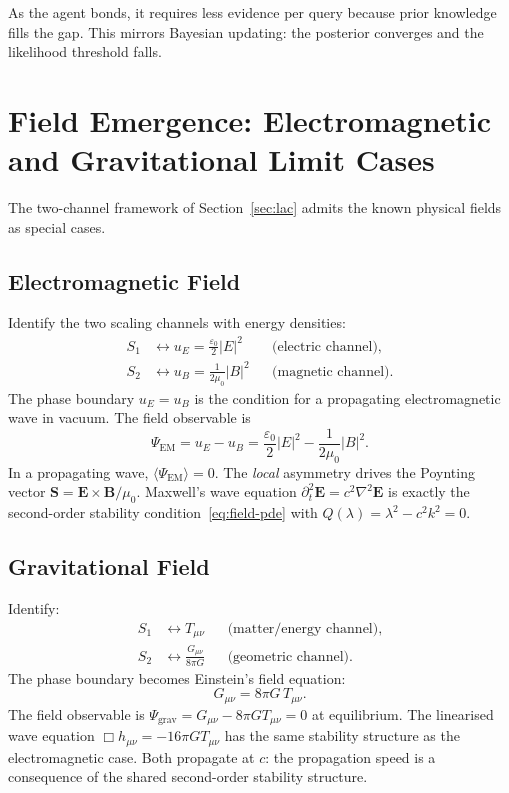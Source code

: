 \documentclass[12pt,a4paper]{article}
\theoremstyle{plain}
\theoremstyle{definition}
\theoremstyle{remark}
\begin{document}
As the agent bonds, it requires less evidence per query because prior
knowledge fills the gap.  This mirrors Bayesian updating: the posterior
converges and the likelihood threshold falls.

\section{Field Emergence: Electromagnetic and Gravitational Limit Cases}
\label{sec:fields}

The two-channel framework of Section~\ref{sec:lac} admits the
known physical fields as special cases.

\subsection{Electromagnetic Field}

Identify the two scaling channels with energy densities:
\begin{align}
S_1 &\leftrightarrow u_E = \frac{\varepsilon_0}{2}|E|^2
    && \text{(electric channel)}, \\
S_2 &\leftrightarrow u_B = \frac{1}{2\mu_0}|B|^2
    && \text{(magnetic channel)}.
\end{align}
The phase boundary $u_E = u_B$ is the condition for a propagating
electromagnetic wave in vacuum.  The field observable is
\begin{equation}
\Psi_{\text{EM}} = u_E - u_B
= \frac{\varepsilon_0}{2}|E|^2 - \frac{1}{2\mu_0}|B|^2.
\end{equation}
In a propagating wave, $\langle\Psi_{\text{EM}}\rangle = 0$.
The \emph{local} asymmetry drives the Poynting vector
$\mathbf{S} = \mathbf{E}\times\mathbf{B}/\mu_0$.
Maxwell's wave equation
$\partial_t^2\mathbf{E} = c^2\nabla^2\mathbf{E}$
is exactly the second-order stability condition~\eqref{eq:field-pde}
with $Q(\lambda) = \lambda^2 - c^2k^2 = 0$.

\subsection{Gravitational Field}

Identify:
\begin{align}
S_1 &\leftrightarrow T_{\mu\nu} && \text{(matter/energy channel)}, \\
S_2 &\leftrightarrow \frac{G_{\mu\nu}}{8\pi G} && \text{(geometric channel)}.
\end{align}
The phase boundary becomes Einstein's field equation:
\begin{equation}
G_{\mu\nu} = 8\pi G\, T_{\mu\nu}.
\end{equation}
The field observable is $\Psi_{\text{grav}} = G_{\mu\nu} - 8\pi G T_{\mu\nu} = 0$
at equilibrium.  The linearised wave equation $\Box h_{\mu\nu} = -16\pi G T_{\mu\nu}$
has the same stability structure as the electromagnetic case.
Both propagate at $c$: the propagation speed is a consequence of the
shared second-order stability structure.
\end{document}
